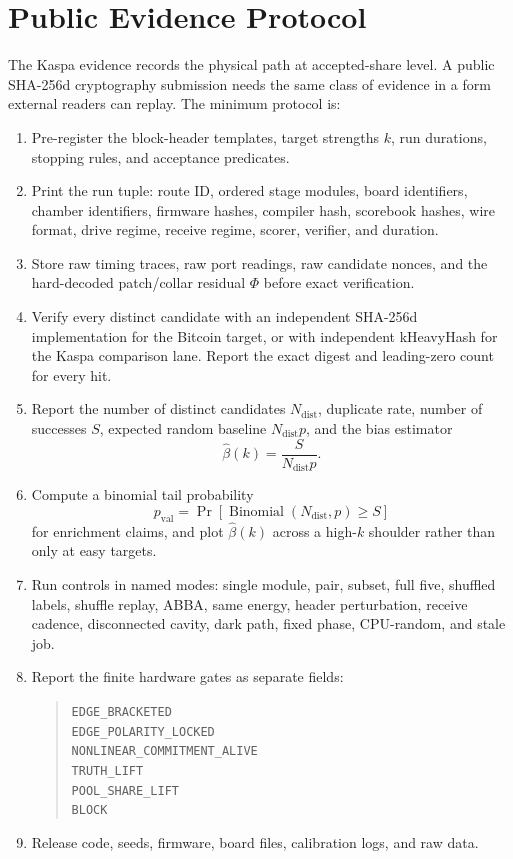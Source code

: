 \documentclass[11pt]{article}
\theoremstyle{definition}
\theoremstyle{remark}
\begin{document}
\section{Public Evidence Protocol}

The Kaspa evidence records the physical path at accepted-share level. A public
SHA-256d cryptography submission needs the same class of evidence in a form
external readers can replay. The minimum protocol is:

\begin{enumerate}
\item Pre-register the block-header templates, target strengths \(k\), run
durations, stopping rules, and acceptance predicates.
\item Print the run tuple: route ID, ordered stage modules, board identifiers,
chamber identifiers, firmware hashes, compiler hash, scorebook hashes, wire
format, drive regime, receive regime, scorer, verifier, and duration.
\item Store raw timing traces, raw port readings, raw candidate nonces, and the
hard-decoded patch/collar residual \(\Phi\) before exact verification.
\item Verify every distinct candidate with an independent SHA-256d
implementation for the Bitcoin target, or with independent kHeavyHash for the
Kaspa comparison lane. Report the exact digest and leading-zero count for every
hit.
\item Report the number of distinct candidates \(N_{\mathrm{dist}}\), duplicate
rate, number of successes \(S\), expected random baseline
\(N_{\mathrm{dist}}p\), and the bias estimator
\[
\widehat\beta(k)=\frac{S}{N_{\mathrm{dist}}p}.
\]
\item Compute a binomial tail probability
\[
p_{\mathrm{val}}=\Pr\left[\operatorname{Binomial}(N_{\mathrm{dist}},p)\ge S\right]
\]
for enrichment claims, and plot \(\widehat\beta(k)\) across a high-\(k\) shoulder
rather than only at easy targets.
\item Run controls in named modes: single module, pair, subset, full five,
shuffled labels, shuffle replay, ABBA, same energy, header perturbation,
receive cadence, disconnected cavity, dark path, fixed phase, CPU-random, and
stale job.
\item Report the finite hardware gates as separate fields:
\begin{quote}\small
\texttt{EDGE\_BRACKETED}\\
\texttt{EDGE\_POLARITY\_LOCKED}\\
\texttt{NONLINEAR\_COMMITMENT\_ALIVE}\\
\texttt{TRUTH\_LIFT}\\
\texttt{POOL\_SHARE\_LIFT}\\
\texttt{BLOCK}
\end{quote}
\item Release code, seeds, firmware, board files, calibration logs, and raw
data.
\end{enumerate}
\end{document}
